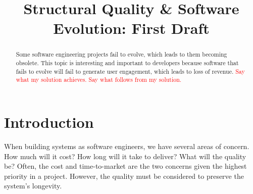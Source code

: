 \documentclass[12pt,conference]{IEEEtran}
\newcommand\todo[1]{\textcolor{red}{#1}}
\begin{document}
\pagestyle{plain}

\title{Structural Quality \& Software Evolution: \newline First Draft}

\author{
}

\maketitle

\begin{abstract}

Some software engineering projects fail to evolve, which leads to them becoming obsolete.
This topic is interesting and important to developers because software that fails to evolve will fail to generate user engagement, which leads to loss of revenue.
\todo{Say what my solution achieves.}
\todo{Say what follows from my solution.}

\end{abstract}

\section{Introduction}

When building systems as software engineers, we have several areas of concern. How much will it cost? How long will it take to deliver? What will the quality be? Often, the cost and time-to-market are the two concerns given the highest priority in a project. However, the quality must be considered to preserve the system's longevity.
\end{document}
